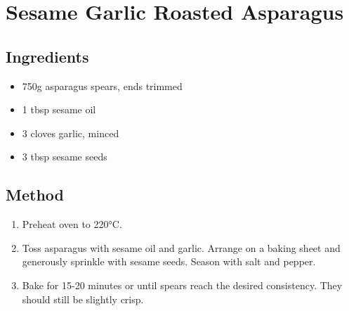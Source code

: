 \section{Sesame Garlic Roasted Asparagus}
\begin{multicols}{2}
  \subsection{Ingredients}
    \begin{itemize}
      \item 750g asparagus spears, ends trimmed
      \item 1 tbsp sesame oil
      \item 3 cloves garlic, minced
      \item 3 tbsp sesame seeds
    \end{itemize}
  \vfill\null
  \columnbreak
  \subsection{Method}
    \begin{enumerate}
      \item Preheat oven to \ang{220}C.
      \item Toss asparagus with sesame oil and garlic. Arrange on a baking sheet and generously sprinkle with sesame seeds. Season with salt and pepper.
      \item Bake for 15-20 minutes or until spears reach the desired consistency. They should still be slightly crisp.
    \end{enumerate}
  \end{multicols}
